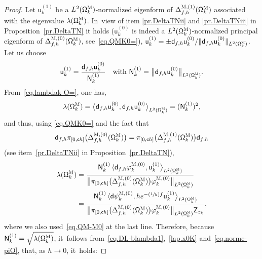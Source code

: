 \documentclass[10pt]{amsart}
\newcommand{\Psfrac}[2]{(\sfrac{#1}{#2})}
\theoremstyle{plain}
\theoremstyle{definition}
\begin{document}
\begin{proof}
Let $\mathsf u^{(1)}_k$ be a $L^2(\mathsf
\Omega_k^{\textsc{M}})$-normalized eigenform of $
\Delta_{f,h}^{\textsc{M},(1)} (\mathsf \Omega_k^{\textsc{M}}) $
associated with the eigenvalue $\lambda(\mathsf
\Omega_k^{\textsc{M}})$. In~view of item \eqref{pr.DeltaTNii} and \eqref{pr.DeltaTNiii} in Proposition~\ref{pr.DeltaTN} it holds ($\mathsf u^{(0)}_k$ is indeed a
$L^2(\mathsf
\Omega_k^{\textsc{M}})$-normalized principal eigenform of $\Delta_{f,h}^{\textsc{M},(0)}
(\mathsf \Omega_k^{\textsc{M}})$, see~\eqref{eq.QMK0=}),
$\mathsf u^{(1)}_k=\pm \mathsf d_{f,h} \mathsf u^{(0)}_k / \Vert \mathsf d_{f,h} \mathsf u^{(0)}_k \Vert_{L^2(\mathsf \Omega_k^{\textsc{M}})}$.
Let us choose
\begin{equation}\label{eq.u1k}
\mathsf u^{(1)}_k=\frac{ \mathsf d_{f,h} \mathsf u^{(0)}_k } { \mathsf N_k^{(1)}} \quad\text{with } \mathsf N_k^{(1)}=\big \Vert \mathsf d_{f,h} \mathsf u^{(0)}_k\big \Vert_{L^2(\mathsf \Omega_k^{\textsc{M}})}.
\end{equation}
From~\eqref{eq.lambdak-O=}, one has,
\[
\lambda(\mathsf
\Omega_k^{\textsc{M}})= \bigl\langle \mathsf d_{f,h} \mathsf u^{(0)}_k, \mathsf d_{f,h} \mathsf u^{(0)}_k \big \rangle_{ L^2(\mathsf
\Omega_k^{\textsc{M}})}=(\mathsf N_k^{(1)})^2,
\]
and thus, using \eqref{eq.QMK0=} and the fact that
\[
\mathsf d_{f,h} \pi_{[0,\mathsf ch ]}\bigl(\Delta_{f,h}^{\textsc{M},(0)} (\mathsf \Omega_k^{\textsc{M}})\bigr)= \pi_{[0,\mathsf ch ]}\bigl(\Delta_{f,h}^{\textsc{M},(1)} (\mathsf \Omega_k^{\textsc{M}})\bigr) \mathsf d_{f,h}
\]
(see item~\eqref{pr.DeltaTNii} in Proposition~\ref{pr.DeltaTN}),
\begin{align*}
\lambda(\mathsf \Omega_k^{\textsc{M}})&=\frac{\mathsf N_k^{(1)} \,\langle \mathsf d_{f,h} \varphi^{\textsc{M},(0)}_k, \mathsf u^{(1)}_k \big \rangle_{ L^2(\mathsf \Omega_k^{\textsc{M}})}}{ \bigl\Vert\pi_{[0,\mathsf ch ]}\bigl(\Delta_{f,h}^{\textsc{M},(0)} (\mathsf \Omega_k^{\textsc{M}})\bigr) \varphi^{\textsc{M},(0)}_k \bigr\Vert_{L^2(\mathsf \Omega_k^{\textsc{M}})} } \\
&=\frac{\mathsf N_k^{(1)} \,\langle \mathsf d \psi^{\textsc{M},(0)}_k, h e^{-\Psfrac 1hf} \mathsf u^{(1)}_k \big \rangle_{ L^2(\mathsf \Omega_k^{\textsc{M}})}}{ \bigl\Vert\pi_{[0,\mathsf ch ]}\bigl(\Delta_{f,h}^{\textsc{M},(0)} (\mathsf \Omega_k^{\textsc{M}})\bigr) \varphi^{\textsc{M},(0)}_k \bigr\Vert_{L^2(\mathsf \Omega_k^{\textsc{M}})} \mathsf Z_{z_k} },
\end{align*}
where we also used~\eqref{eq.QM-M0} at the last line. Therefore, because $\mathsf N_k^{(1)}=\sqrt { \lambda(\mathsf \Omega_k^{\textsc{M}})}$, it~follows from~\eqref{eq.DL-blambda1},~\eqref{lap.x0K} and~\eqref{eq.norme-piO}, that, as $h\to 0$, it~holds:

\end{proof}
\end{document}
